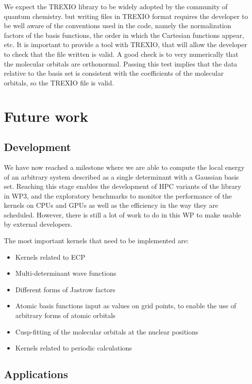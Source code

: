 We expect the \ac{TREXIO} library to be widely adopted by the community of
quantum chemistry. but writing files in \ac{TREXIO} format requires the developer
to be well aware of the conventions used in the code, namely the normalization factors
of the basis functions, the order in which the Cartesian functions appear, etc.
It is important to provide a tool with \ac{TREXIO}, that will allow the developer to
check that the file written is valid. A good check is to very numerically that the
molecular orbitals are orthonormal. Passing this test implies that the data
relative to the basis set is consistent with the coefficients of the molecular
orbitals, so the \ac{TREXIO} file is valid.

\section{Future work}

\subsection{Development}

We have now reached a milestone where we are able to compute the local energy of an
arbitrary system described as a single determinant with a Gaussian basis set.
Reaching this stage enables the development of \ac{HPC} variants of the library in
\ac{WP}3, and the exploratory benchmarks to monitor the performance of the kernels on
CPUs and \acp{GPU} as well as the efficiency in the way they are scheduled.
However, there is still a lot of work to do in this \ac{WP} to make \QMCkl{}
usable by external developers.

The most important kernels that need to be implemented are:
\begin{itemize}
  \item Kernels related to \ac{ECP}
  \item Multi-determinant wave functions
  \item Different forms of Jastrow factors
  \item Atomic basis functions input as values on grid points, to enable the use of
        arbitrary forms of atomic orbitals
  \item Cusp-fitting of the molecular orbitals at the nuclear positions
  \item Kernels related to periodic calculations
\end{itemize}

\subsection{Applications}

